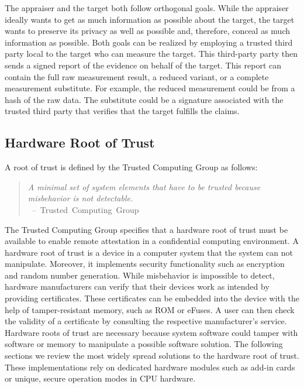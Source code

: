 The appraiser and the target both follow orthogonal goals. While the appraiser
ideally wants to get as much information as possible about the target, the
target wants to preserve its privacy as well as possible and, therefore, conceal
as much information as possible. Both goals can be realized by employing a
trusted third party local to the target who can measure the target. This
third-party party then sends a signed report of the evidence on behalf of the
target. This report can contain the full raw measurement result, a reduced
variant, or a complete measurement substitute. For example, the reduced
measurement could be from a hash of the raw data. The substitute could be a
signature associated with the trusted third party that verifies that the target
fulfills the claims.

\subsection{Hardware Root of Trust}
\label{sec:20:hardware_root_of_trust}
A root of trust is defined by the Trusted Computing Group as follows:
\begin{quote}
    \textit{ A minimal set of system elements that have to be trusted because
        misbehavior is not detectable. \\
    } \mbox{ -- Trusted Computing Group\cite{tpm_architecture}}
\end{quote}

The Trusted Computing Group specifies that a hardware root of trust must be
available to enable remote attestation in a confidential computing
environment.\cite{tpm_architecture} A hardware root of trust is a device in a
computer system that the system can not manipulate. Moreover, it implements
security functionality such as encryption and random number generation. While
misbehavior is impossible to detect, hardware manufacturers can verify that
their devices work as intended by providing certificates. These certificates can
be embedded into the device with the help of tamper-resistant memory, such as
ROM or eFuses. A user can then check the validity of a certificate by consulting
the respective manufacturer's service. \\

Hardware roots of trust are necessary because system software could tamper with
software or memory to manipulate a possible software solution. The following
sections we review the most widely spread solutions to the hardware root of
trust. These implementations rely on dedicated hardware modules such as add-in
cards or unique, secure operation modes in CPU hardware. \\

